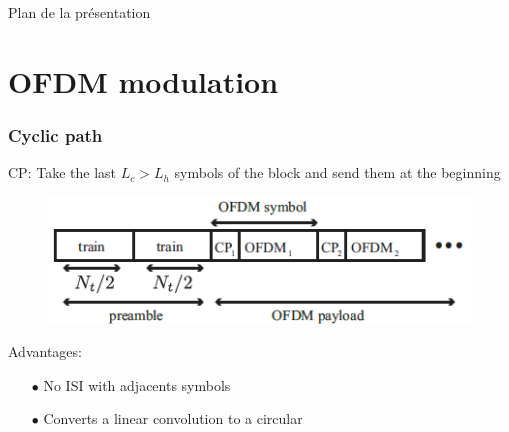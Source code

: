 \documentclass[11pt]{beamer}
\begin{document}
{
	\begin{frame}[noframenumbering]{Plan de la présentation}
		\tableofcontents
	\end{frame}
}

\section{OFDM modulation}

\begin{frame}
\frametitle{Cyclic path}
CP: Take the last $L_c>L_h$ symbols of the block and send them at the beginning
\begin{figure}[!ht]
\centering
\includegraphics[scale=0.55]{img/operation_ofdm.png}
\label{fig1}
\end{figure}
Advantages:
\begin{itemize}

\item[$\bullet$] No ISI with adjacents symbols  
\item[$\bullet$] Converts a linear convolution to a circular

\end{itemize}

\end{frame}
\end{document}
